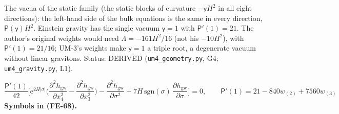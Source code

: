 \documentclass[
  10pt,
]{article}
\begin{document}
The vacua of the static family (the static blocks of curvature
\(-\mathsf{y}H^2\) in all eight directions): the left-hand side of the
bulk equations is the same in every direction,
\(\mathsf{P}(\mathsf{y})H^2\). Einstein gravity has the single vacuum
\(\mathsf{y} = 1\) with \(\mathsf{P}'(1) = 21\). The author's original
weights would need \(\Lambda = -161H^2/16\) (not his \(-10H^2\)), with
\(\mathsf{P}'(1) = 21/16\); UM-3's weights make \(\mathsf{y} = 1\) a
triple root, a degenerate vacuum without linear gravitons. Status:
DERIVED (\texttt{um4\_geometry.py}, G4; \texttt{um4\_gravity.py}, L1).

\[
\frac{\mathsf{P}'(1)}{42}\Big[\mathrm{e}^{2H\lvert\sigma\rvert}\Big(\frac{\partial^2h_{\mathrm{gw}}}{\partial x_4^2}
 - \frac{\partial^2h_{\mathrm{gw}}}{\partial x_3^2}\Big) - \frac{\partial^2h_{\mathrm{gw}}}{\partial\sigma^2}
 + 7H\,\mathrm{sgn}(\sigma)\,\frac{\partial h_{\mathrm{gw}}}{\partial\sigma}\Big] = 0,\qquad
\mathsf{P}'(1) = 21 - 840w_{(2)} + 7560w_{(3)} \tag{FE-68}
\] \textbf{Symbols in (FE-68).}
\end{document}
